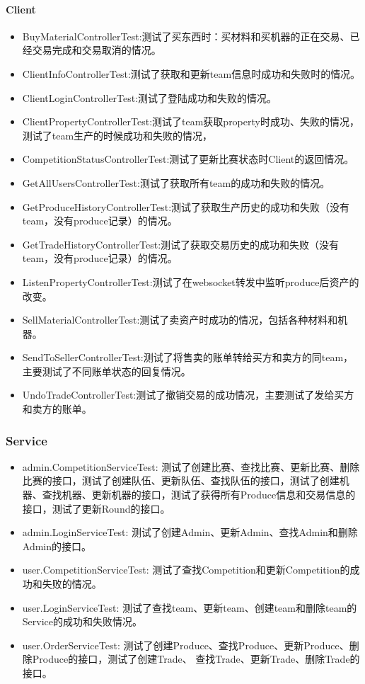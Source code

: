 \documentclass{article}
\begin{document}
						\paragraph{Client}
							\begin{itemize}
							\item BuyMaterialControllerTest:测试了买东西时：买材料和买机器的正在交易、已经交易完成和交易取消的情况。
							\item ClientInfoControllerTest:测试了获取和更新team信息时成功和失败时的情况。
							\item ClientLoginControllerTest:测试了登陆成功和失败的情况。
							\item ClientPropertyControllerTest:测试了team获取property时成功、失败的情况，测试了team生产的时候成功和失败的情况，
							\item CompetitionStatusControllerTest:测试了更新比赛状态时Client的返回情况。
							\item GetAllUsersControllerTest:测试了获取所有team的成功和失败的情况。
							\item GetProduceHistoryControllerTest:测试了获取生产历史的成功和失败（没有team，没有produce记录）的情况。
							\item GetTradeHistoryControllerTest:测试了获取交易历史的成功和失败（没有team，没有produce记录）的情况。
							\item ListenPropertyControllerTest:测试了在websocket转发中监听produce后资产的改变。
							\item SellMaterialControllerTest:测试了卖资产时成功的情况，包括各种材料和机器。
							\item SendToSellerControllerTest:测试了将售卖的账单转给买方和卖方的同team，主要测试了不同账单状态的回复情况。
							\item UndoTradeControllerTest:测试了撤销交易的成功情况，主要测试了发给买方和卖方的账单。
							\end{itemize}
					\subsubsection{Service}
						\begin{itemize}
							\item admin.CompetitionServiceTest: 测试了创建比赛、查找比赛、更新比赛、删除比赛的接口，测试了创建队伍、更新队伍、查找队伍的接口，测试了创建机器、查找机器、更新机器的接口，测试了获得所有Produce信息和交易信息的接口，测试了更新Round的接口。
							\item admin.LoginServiceTest: 测试了创建Admin、更新Admin、查找Admin和删除Admin的接口。
							\item user.CompetitionServiceTest: 测试了查找Competition和更新Competition的成功和失败的情况。
							\item user.LoginServiceTest: 测试了查找team、更新team、创建team和删除team的Service的成功和失败情况。
							\item user.OrderServiceTest: 测试了创建Produce、查找Produce、更新Produce、删除Produce的接口，测试了创建Trade、 查找Trade、更新Trade、删除Trade的接口。
						\end{itemize}
\end{document}
